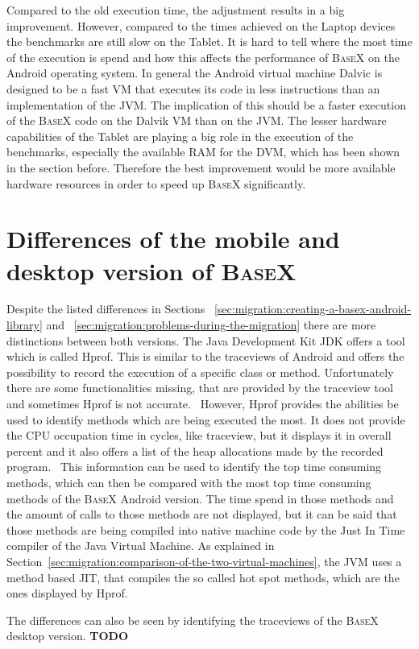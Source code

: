 Compared to the old execution time, the adjustment results in a big improvement.
However, compared to the times achieved on the Laptop devices the benchmarks are still slow on the Tablet.
It is hard to tell where the most time of the execution is spend and how this affects the performance of \textsc{BaseX} on the Android operating system.
In general the Android virtual machine Dalvic is designed to be a fast VM that executes its code in less instructions than an implementation of the JVM.
The implication of this should be a faster execution of the \textsc{BaseX} code on the Dalvik VM than on the JVM.
The lesser hardware capabilities of the Tablet are playing a big role in the execution of the benchmarks, especially the available RAM for the DVM, which has been shown in the section before.
Therefore the best improvement would be more available hardware resources in order to speed up \textsc{BaseX} significantly.



\section{Differences of the mobile and desktop version of \textsc{BaseX}}
\label{sec:differences-of-the-two-basex-versions}
Despite the listed differences in Sections ~\ref{sec:migration:creating-a-basex-android-library} and ~\ref{sec:migration:problems-during-the-migration} there are more distinctions between both versions.
The Java Development Kit JDK offers a tool which is called Hprof.
This is similar to the traceviews of Android and offers the possibility to record the execution of a specific class or method.
Unfortunately there are some functionalities missing, that are provided by the traceview tool and sometimes Hprof is not accurate.~\cite{mytkowicz2010evaluating}
However, Hprof provides the abilities be used to identify methods which are being executed the most.
It does not provide the CPU occupation time in cycles, like traceview, but it displays it in overall percent and it also offers a list of the heap allocations made by the recorded program.~\cite{liang1999comprehensive}
This information can be used to identify the top time consuming methods, which can then be compared with the most top time consuming methods of the \textsc{BaseX} Android version.
The time spend in those methods and the amount of calls to those methods are not displayed, but it can be said that those methods are being compiled into native machine code by the Just In Time compiler of the Java Virtual Machine.
As explained in Section~\ref{sec:migration:comparison-of-the-two-virtual-machines}, the JVM uses a method based JIT, that compiles the so called hot spot methods, which are the ones displayed by Hprof. 


The differences can also be seen by identifying the traceviews of the \textsc{BaseX} desktop version.
\textbf{TODO}



